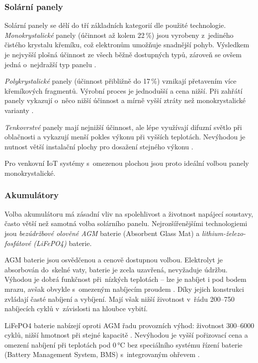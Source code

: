 \subsubsection*{Solární panely}
Solární panely se dělí do tří základních kategorií dle použité technologie. \textit{Monokrystalické} panely (účinnost až kolem 22\,\%) jsou vyrobeny z~jediného čistého krystalu křemíku, což elektronům umožňuje snadnější pohyb. Výsledkem je nejvyšší plošná účinnost ze všech běžně dostupných typů, zároveň se ovšem jedná o~nejdražší typ panelu \cite{solarPanels}. 

\textit{Polykrystalické} panely (účinnost přibližně do 17\,\%) vznikají přetavením více křemíkových fragmentů. Výrobní proces je jednodušší a cena nižší. Při zahřátí panely vykazují o~něco nižší účinnost a mírně vyšší ztráty než monokrystalické varianty \cite{solarPanels}.

\textit{Tenkovrstvé} panely mají nejnižší účinnost, ale lépe využívají difuzní světlo při oblačnosti a vykazují menší pokles výkonu při vyšších teplotách. Nevýhodou je nutnost větší instalační plochy pro dosažení stejného výkonu \cite{solarPanels}. 

Pro venkovní IoT systémy s~omezenou plochou jsou proto ideální volbou panely monokrystalické.

\subsubsection*{Akumulátory}
Volba akumulátoru má zásadní vliv na spolehlivost a životnost napájecí soustavy, často větší než samotná volba solárního panelu. Nejrozšířenějšími technologiemi jsou \textit{bezúdržbové olověné AGM} baterie (Absorbent Glass Mat) a \textit{lithium-železo-fosfátové (LiFePO4)} baterie. 

AGM baterie jsou osvědčenou a cenově dostupnou volbou. Elektrolyt je absorbován do~skelné vaty, baterie je zcela uzavřená, nevyžaduje údržbu. Výhodou je dobrá funkčnost při~nízkých teplotách -- lze je nabíjet i pod bodem mrazu, avšak obvykle s~omezeným nabíjecím proudem \cite{winterBattery}. Díky jejich konstrukci zvládají časté nabíjení a vybíjení. Mají však nižší životnost v~řádu 200--750 nabíjecích cyklů v~závislosti na hloubce vybití. 

LiFePO4 baterie nabízejí oproti AGM řadu provozních výhod: životnost 300--6000 cyklů, nižší hmotnost při stejné kapacitě \cite{AGM-LiFePO4}. Nevýhodou je vyšší pořizovací cena a omezení nabíjení při teplotách pod 0\,°C bez speciálního systému řízení baterie (Battery Management System, BMS) s~integrovaným ohřevem \cite{winterBattery}.

